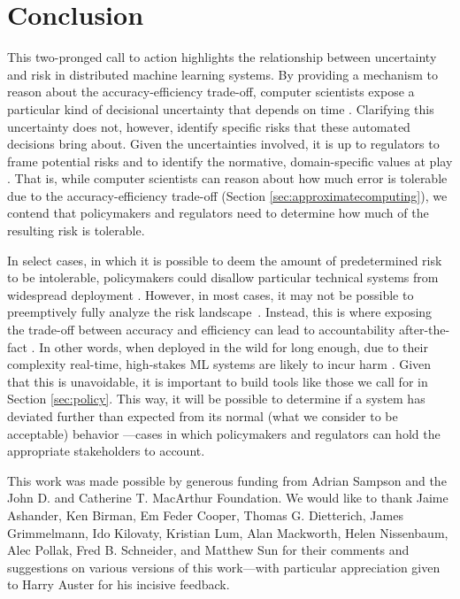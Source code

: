\documentclass[sigplan,screen]{acmart}
\begin{document}
\section{Conclusion} \label{conclusion}
This two-pronged call to action highlights the relationship between uncertainty and risk in distributed machine learning systems. By providing a mechanism to reason about the accuracy-efficiency trade-off, computer scientists expose a particular kind of decisional uncertainty that depends on time \cite{horvitz1987constraints, boddy1994deliberation}. Clarifying this uncertainty does not, however, identify specific risks that these automated decisions bring about. Given the uncertainties involved, it is up to regulators to frame potential risks and to identify the normative, domain-specific values at play \cite{jasanoff2016ethics, flanagan2014values}. That is, while computer scientists can reason about how much error is tolerable due to the accuracy-efficiency trade-off (Section \ref{sec:approximatecomputing}), we contend that policymakers and regulators need to determine how much of the resulting risk is tolerable. 

In select cases, in which it is possible to deem the amount of predetermined risk to be intolerable, policymakers could disallow particular technical systems from widespread deployment \cite{sachs2011precaution, Dietterich2018robustAI, perrow1999risk}. However, in most cases, it may not be possible to preemptively fully analyze the risk landscape~\cite{sunstein2003precaution, smith2015opportunism}. Instead, this is where exposing the trade-off between accuracy and efficiency can lead to accountability after-the-fact \cite{backes2009csar, Haeberlen2007peerreview, Lampson2004security}. In other words, when deployed in the wild for long enough, due to their complexity real-time, high-stakes ML systems are likely to incur harm \cite{perrow1999risk, vaughan1996challenger, Nissenbaum1996accountability}. Given that this is unavoidable, it is important to build tools like those we call for in Section \ref{sec:policy}. This way, it will be possible to determine if a system has deviated further than expected from its normal (what we consider to be acceptable) behavior \cite{sampson2015thesis}---cases in which policymakers and regulators can hold the appropriate stakeholders to account.

\begin{acks}
This work was made possible by generous funding from Adrian Sampson and the John D. and Catherine T. MacArthur Foundation. We would like to thank Jaime Ashander, Ken Birman, Em Feder Cooper, Thomas G. Dietterich, James Grimmelmann, Ido Kilovaty, Kristian Lum, Alan Mackworth, Helen Nissenbaum, Alec Pollak, Fred B. Schneider, and Matthew Sun for their comments and suggestions on various versions of this work---with particular appreciation given to Harry Auster for his incisive feedback.
\end{acks}
\end{document}
